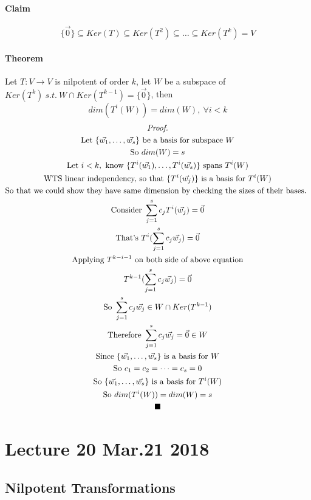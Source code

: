\documentclass[11pt]{article}
\newcommand{\trans}[3]{{#1}: {#2} \to {#3}}
\newcommand{\vset}[3]{\{\vec{{#1}_{#2}}, \dots, \vec{{#1}_{#3}}\}}
\newcommand{\theorem}[0]{\paragraph{Theorem}}
\newcommand{\tx}[1]{\text{{#1}}}
\begin{document}
	\paragraph{Claim} 
	\[
		\{\vec{0}\} \subseteq Ker(T) \subseteq Ker(T^2) \subseteq \dots \subseteq Ker(T^k) = V
	\]
	
	\theorem Let $\trans{T}{V}{V}$ is nilpotent of order $k$, let $W$ be a subspace of $Ker(T^k)\ s.t.\ W \cap Ker(T^{k-1}) = \{\vec{0}\}$, then
	\[
		dim(T^i(W)) = dim(W),\ \forall i < k
	\]
	\begin{multline*}
		\emph{Proof.} \\ 
		\tx{Let } \vset{w}{1}{s} \tx{ be a basis for subspace }W \\
		\tx{So } dim(W) = s \\
		\tx{Let } i < k, \tx{ know } \{T^i(\vec{w_1}),\dots,T^i(\vec{w_s})\} \tx{ spans }T^i(W) \\
		\tx{WTS linear independency, so that } \{T^i(\vec{w_j})\}\tx{ is a basis for }T^i(W) \\
		\tx{So that we could show they have same dimension by checking the sizes of their bases. }\\
		\tx{Consider } \sum_{j=1}^{s}{c_j T^i(\vec{w_j})} = \vec{0} \\
		\tx{That's } T^i(\sum_{j=1}^{s}{c_j \vec{w_j}}) = \vec{0} \\
		\tx{Applying } T^{k-i-1} \tx{ on both side of above equation} \\
		T^{k-1}(\sum_{j=1}^{s}{c_j \vec{w_j}}) = \vec{0} \\
		\tx{So } \sum_{j=1}^{s}{c_j \vec{w_j}} \in W \cap Ker(T^{k-1}) \\
		\tx{Therefore } \sum_{j=1}^{s}{c_j \vec{w_j}} = \vec{0} \in W\\
		\tx{Since } \vset{w}{1}{s} \tx{ is a basis for } W \\
		\tx{So } c_1 = c_2 = \dots = c_s = 0 \\
		\tx{So } \vset{w}{1}{s} \tx{ is a basis for }T^i(W) \\
		\tx{So } dim(T^i(W)) = dim(W) = s \\
		\blacksquare
	\end{multline*}
	
	\section{Lecture 20 Mar.21 2018}
	\subsection{Nilpotent Transformations}
\end{document}
